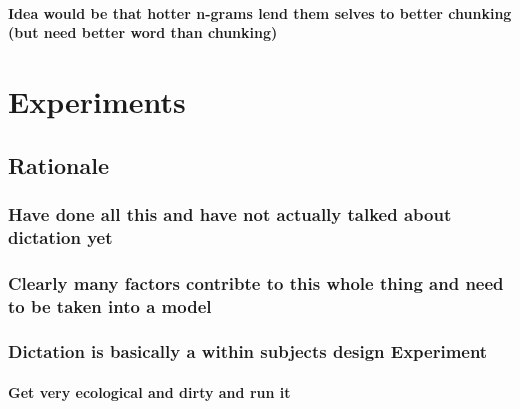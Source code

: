 \documentclass[]{book}
\begin{document}
\hypertarget{idea-would-be-that-hotter-n-grams-lend-them-selves-to-better-chunking-but-need-better-word-than-chunking}{%
\subsubsection{Idea would be that hotter n-grams lend them selves to better chunking (but need better word than chunking)}\label{idea-would-be-that-hotter-n-grams-lend-them-selves-to-better-chunking-but-need-better-word-than-chunking}}

\hypertarget{experiments}{%
\chapter{Experiments}\label{experiments}}

\hypertarget{rationale-2}{%
\section{Rationale}\label{rationale-2}}

\hypertarget{have-done-all-this-and-have-not-actually-talked-about-dictation-yet}{%
\subsection{Have done all this and have not actually talked about dictation yet}\label{have-done-all-this-and-have-not-actually-talked-about-dictation-yet}}

\hypertarget{clearly-many-factors-contribte-to-this-whole-thing-and-need-to-be-taken-into-a-model}{%
\subsection{Clearly many factors contribte to this whole thing and need to be taken into a model}\label{clearly-many-factors-contribte-to-this-whole-thing-and-need-to-be-taken-into-a-model}}

\hypertarget{dictation-is-basically-a-within-subjects-design-experiment}{%
\subsection{Dictation is basically a within subjects design Experiment}\label{dictation-is-basically-a-within-subjects-design-experiment}}

\hypertarget{get-very-ecological-and-dirty-and-run-it}{%
\subsubsection{Get very ecological and dirty and run it}\label{get-very-ecological-and-dirty-and-run-it}}
\end{document}
